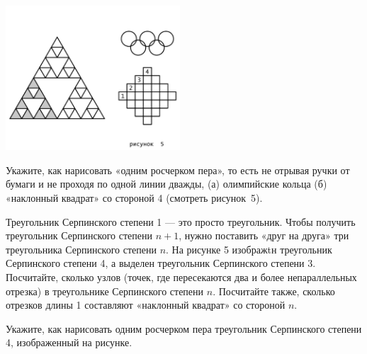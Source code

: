 ﻿

\begin{enumerate}
\itA \ \\ \vspace{-1.65cm}
\begin{center}
	\includegraphics[width=6.5cm]{stats/2018/images/serpinsky}
\end{center}

Укажите, как нарисовать «одним росчерком пера», то есть не отрывая ручки от бумаги и не проходя по одной линии дважды, (а) олимпийские кольца (б) «наклонный квадрат» со стороной 4 (смотреть рисунок~5).

\itB Треугольник Серпинского степени 1 — это просто треугольник. Чтобы получить треугольник Серпинского степени $n+1$, нужно поставить «друг на друга» три треугольника Серпинского степени $n$. На рисунке 5 изображtн треугольник Серпинского степени 4, а выделен треугольник Серпинского степени 3. Посчитайте, сколько узлов (точек, где пересекаются два и более непараллельных отрезка) в треугольнике Серпинского степени $n$. Посчитайте также, сколько отрезков длины 1 составляют «наклонный квадрат» со стороной $n$.

\itC Укажите, как нарисовать одним росчерком пера треугольник Серпинского степени 4, изображенный на рисунке.
\end{enumerate}